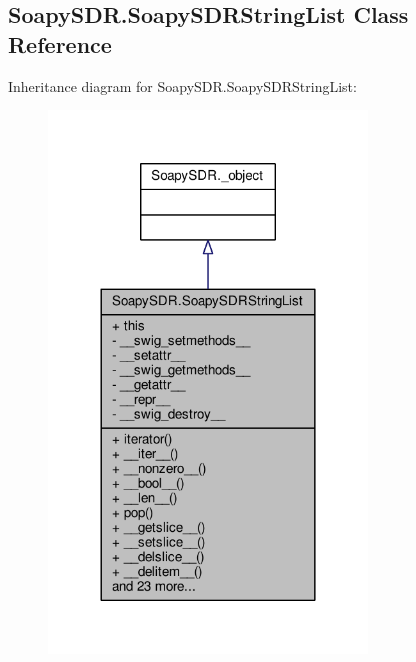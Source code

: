 \subsection{Soapy\+S\+D\+R.\+Soapy\+S\+D\+R\+String\+List Class Reference}
\label{classSoapySDR_1_1SoapySDRStringList}


Inheritance diagram for Soapy\+S\+D\+R.\+Soapy\+S\+D\+R\+String\+List\+:
\nopagebreak
\begin{figure}[H]
\begin{center}
\leavevmode
\includegraphics[width=240pt]{dd/d05/classSoapySDR_1_1SoapySDRStringList__inherit__graph}
\end{center}
\end{figure}


